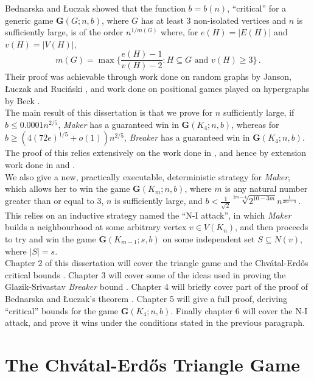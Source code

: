 \documentclass[a4paper,oneside,11pt]{report}
\begin{document}
Bednarska and \L{}uczak \cite{bednarska2000biased} showed that the function $b=b(n)$, ``critical'' for a generic game $\textbf{G}(G;n,b)$, where $G$ has at least 3 non-isolated vertices and $n$ is sufficiently large, is of the order $n^{1/m(G)}$ where, for $e(H)=\lvert E(H) \rvert$ and $v(H) = \lvert V(H) \rvert$, \[m(G)=\max\Big\{\frac{e(H)-1}{v(H)-2}:H\subseteq{G} \text{ and } v(H) \geqslant 3\Big\}\,.\] Their proof was achievable through work done on random graphs by Janson, \L{}uczak and Ruci\'{n}ski \cite{janson1990exponential}, and work done on positional games played on hypergraphs by Beck \cite{beck1982remarks}.\\

The main result of this dissertation is that we prove for $n$ sufficiently large, if $b \leqslant 0.0001n^{2/5}$, \textit{Maker} has a guaranteed win in $\textbf{G}(K_4;n,b)$, whereas for $b \geqslant (4(72e)^{1/5}+o(1))n^{2/5}$, \textit{Breaker} has a guaranteed win in $\textbf{G}(K_4;n,b)$. The proof of this relies extensively on the work done in \cite{bednarska2000biased}, and hence by extension work done in \cite{beck1982remarks} and \cite{janson1990exponential}.\\

We also give a new, practically executable, deterministic strategy for \textit{Maker},  which allows her to win the game $\textbf{G}(K_m;n,b)$, where $m$ is any natural number greater than or equal to 3, $n$ is sufficiently large, and $b < \frac{1}{\sqrt{2}}\sqrt[2m-4]{2^{10-3m}}n^{\frac{1}{2m-4}}\,.$ This relies on an inductive strategy named the ``N-I attack'', in which \textit{Maker} builds a neighbourhood at some arbitrary vertex $v \in V(K_n)$, and then proceeds to try and win the game $\textbf{G}(K_{m-1};s,b)$ on some independent set $S \subseteq N(v)$, where $\lvert S \rvert = s$.\\

Chapter 2 of this dissertation will cover the triangle game and the Chvátal-Erdős critical bounds \cite{chvatal1978biased}. Chapter 3 will cover some of the ideas used in proving the Glazik-Srivastav \textit{Breaker} bound \cite{glazik2022new}. Chapter 4 will briefly cover part of the proof of Bednarska and \L{}uczak's theorem \cite{bednarska2000biased}. Chapter 5 will give a full proof, deriving ``critical'' bounds for the game $\textbf{G}(K_4;n,b)$. Finally chapter 6 will cover the N-I attack, and prove it wins under the conditions stated in the previous paragraph.  

\chapter{The Chvátal-Erdős Triangle Game}
\end{document}
